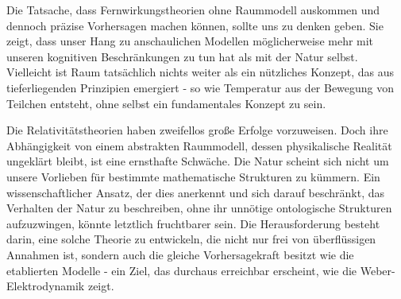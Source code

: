 Die Tatsache, dass Fernwirkungstheorien ohne Raummodell auskommen und dennoch präzise Vorhersagen machen können, sollte uns zu denken geben. Sie zeigt, dass unser Hang zu anschaulichen
Modellen möglicherweise mehr mit unseren kognitiven Beschränkungen zu tun hat als mit der Natur selbst. Vielleicht ist Raum tatsächlich nichts weiter als ein nützliches Konzept, das aus
tieferliegenden Prinzipien emergiert - so wie Temperatur aus der Bewegung von Teilchen entsteht, ohne selbst ein fundamentales Konzept zu sein.

Die Relativitätstheorien haben zweifellos große Erfolge vorzuweisen. Doch ihre Abhängigkeit von einem abstrakten Raummodell, dessen physikalische Realität ungeklärt bleibt, ist eine
ernsthafte Schwäche. Die Natur scheint sich nicht um unsere Vorlieben für bestimmte mathematische Strukturen zu kümmern. Ein wissenschaftlicher Ansatz, der dies anerkennt und sich darauf
beschränkt, das Verhalten der Natur zu beschreiben, ohne ihr unnötige ontologische Strukturen aufzuzwingen, könnte letztlich fruchtbarer sein. Die Herausforderung besteht darin, eine solche
Theorie zu entwickeln, die nicht nur frei von überflüssigen Annahmen ist, sondern auch die gleiche Vorhersagekraft besitzt wie die etablierten Modelle - ein Ziel, das durchaus erreichbar
erscheint, wie die Weber-Elektrodynamik zeigt.
